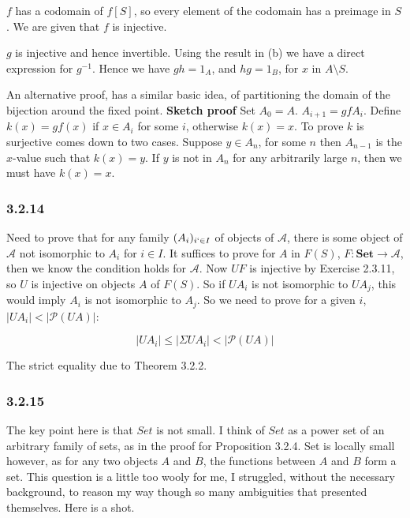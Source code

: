 \documentclass{article}
\begin{document}
$f$ has a codomain of $f\left[S\right]$, so every element of the codomain has a preimage in $S$. We are given that $f$ is injective.

$g$ is injective and hence invertible. Using the result in (b) we have a direct expression for $g^{-1}$. Hence we have $gh = 1_A$, and $hg = 1_B$, for $x$ in $A \setminus S$.

An alternative proof, has a similar basic idea, of partitioning the domain of the bijection around the fixed point. \textbf{Sketch proof} Set $A_0 = A$. $A_{i+1} = gfA_{i}$. Define $k(x) = gf(x)$ if $x \in A_{i}$ for some $i$, otherwise $k(x) = x$. To prove $k$ is surjective comes down to two cases. Suppose $y \in A_{n}$, for some $n$ then $A_{n-1}$ is the $x$-value such that $k(x) = y$. If $y$ is not in $A_{n}$ for any arbitrarily large $n$, then we must have $k(x) = x$.

\subsubsection*{3.2.14}

Need to prove that for any family $(A_i)_{i `\in I}$  of objects of $\mathcal{A}$, there is some object of $\mathcal{A}$ not isomorphic to $A_i$ for $i \in I$.
It suffices to prove for $A$ in $F(S)$,  $F: \mathbf{Set} \rightarrow \mathcal{A}$, then we know the condition holds for $\mathcal{A}$. Now $UF$ is injective by Exercise 2.3.11,
so $U$ is injective on objects $A$ of $F(S)$. So if $UA_i$ is not isomorphic to $UA_j$, this would imply $A_i$ is not isomorphic to $A_j$. So we need to prove for a given $i$,  $|UA_i| < |\mathcal{P}(UA)|$:

\begin{equation*}
  |UA_i| \leq |\Sigma UA_i| < |\mathcal{P}(UA)|
\end{equation*}

The strict equality due to Theorem 3.2.2.

\subsubsection*{3.2.15}

The key point here is that $Set$ is not small. I think of $Set$ as a power set of an arbitrary family of sets, as in the proof for Proposition 3.2.4. Set is locally small however, as for any two objects $A$ and $B$, the functions between $A$ and $B$ form a set. This question is a little too wooly for me, I struggled, without the necessary background, to reason my way though so many ambiguities that presented themselves. Here is a shot.
\end{document}
